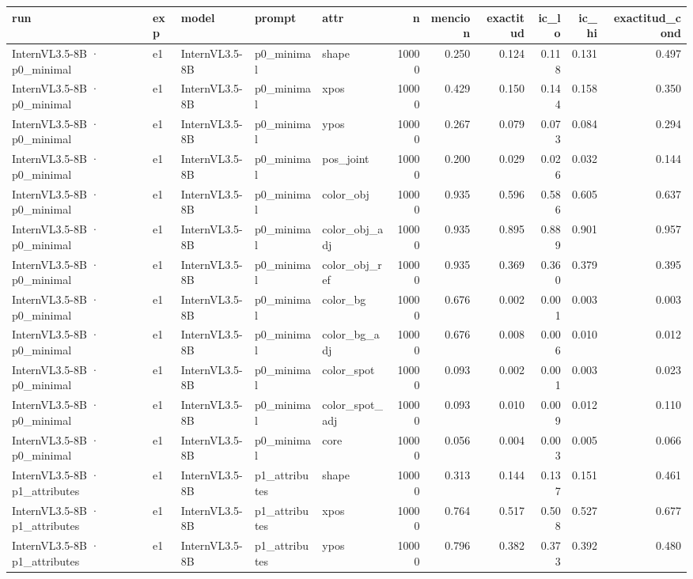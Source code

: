 \begin{tabular}{lllllrrrrrr}
\toprule
run & exp & model & prompt & attr & n & mencion & exactitud & ic\_lo & ic\_hi & exactitud\_cond \\
\midrule
InternVL3.5-8B · p0\_minimal & e1 & InternVL3.5-8B & p0\_minimal & shape & 10000 & 0.250 & 0.124 & 0.118 & 0.131 & 0.497 \\
InternVL3.5-8B · p0\_minimal & e1 & InternVL3.5-8B & p0\_minimal & xpos & 10000 & 0.429 & 0.150 & 0.144 & 0.158 & 0.350 \\
InternVL3.5-8B · p0\_minimal & e1 & InternVL3.5-8B & p0\_minimal & ypos & 10000 & 0.267 & 0.079 & 0.073 & 0.084 & 0.294 \\
InternVL3.5-8B · p0\_minimal & e1 & InternVL3.5-8B & p0\_minimal & pos\_joint & 10000 & 0.200 & 0.029 & 0.026 & 0.032 & 0.144 \\
InternVL3.5-8B · p0\_minimal & e1 & InternVL3.5-8B & p0\_minimal & color\_obj & 10000 & 0.935 & 0.596 & 0.586 & 0.605 & 0.637 \\
InternVL3.5-8B · p0\_minimal & e1 & InternVL3.5-8B & p0\_minimal & color\_obj\_adj & 10000 & 0.935 & 0.895 & 0.889 & 0.901 & 0.957 \\
InternVL3.5-8B · p0\_minimal & e1 & InternVL3.5-8B & p0\_minimal & color\_obj\_ref & 10000 & 0.935 & 0.369 & 0.360 & 0.379 & 0.395 \\
InternVL3.5-8B · p0\_minimal & e1 & InternVL3.5-8B & p0\_minimal & color\_bg & 10000 & 0.676 & 0.002 & 0.001 & 0.003 & 0.003 \\
InternVL3.5-8B · p0\_minimal & e1 & InternVL3.5-8B & p0\_minimal & color\_bg\_adj & 10000 & 0.676 & 0.008 & 0.006 & 0.010 & 0.012 \\
InternVL3.5-8B · p0\_minimal & e1 & InternVL3.5-8B & p0\_minimal & color\_spot & 10000 & 0.093 & 0.002 & 0.001 & 0.003 & 0.023 \\
InternVL3.5-8B · p0\_minimal & e1 & InternVL3.5-8B & p0\_minimal & color\_spot\_adj & 10000 & 0.093 & 0.010 & 0.009 & 0.012 & 0.110 \\
InternVL3.5-8B · p0\_minimal & e1 & InternVL3.5-8B & p0\_minimal & core & 10000 & 0.056 & 0.004 & 0.003 & 0.005 & 0.066 \\
InternVL3.5-8B · p1\_attributes & e1 & InternVL3.5-8B & p1\_attributes & shape & 10000 & 0.313 & 0.144 & 0.137 & 0.151 & 0.461 \\
InternVL3.5-8B · p1\_attributes & e1 & InternVL3.5-8B & p1\_attributes & xpos & 10000 & 0.764 & 0.517 & 0.508 & 0.527 & 0.677 \\
InternVL3.5-8B · p1\_attributes & e1 & InternVL3.5-8B & p1\_attributes & ypos & 10000 & 0.796 & 0.382 & 0.373 & 0.392 & 0.480 \\

\end{tabular}
